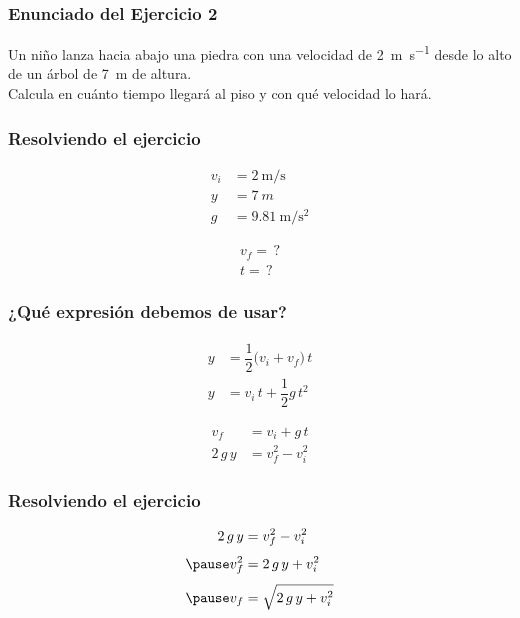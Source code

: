 \documentclass[14pt]{beamer}
\begin{document}
\begin{frame}
\frametitle{Enunciado del Ejercicio 2}
Un niño lanza hacia abajo una piedra con una velocidad de \SI{2}{\meter\per\second} desde lo alto de un árbol de \SI{7}{\meter} de altura. 
\\
\bigskip
\pause
Calcula en cuánto tiempo llegará al piso y con qué velocidad lo hará.
\end{frame}
\begin{frame}
\frametitle{Resolviendo el ejercicio}
\vspace*{-0.3cm}
\pause
\begin{minipage}[t]{0.4\linewidth}
\begin{align*}
v_{i} &= \SI{2}{\meter\per\second} \\[0.5em]
y &= \SI{7}{m} \\[0.5em]
g &= \SI{9.81}{\meter\per\square\second}
\end{align*}
\end{minipage}
\hspace{0.2cm}
\pause
\begin{minipage}[t]{0.4\linewidth}
\begin{align*}
v_{f} = \, ? \\[0.5em]
t = \, ?
\end{align*}
\end{minipage}
\end{frame}
\begin{frame}
\frametitle{¿Qué expresión debemos de usar?}
\vspace*{-1cm}
\begin{minipage}[t]{0.4\linewidth}
\begin{align*}
y &= \dfrac{1}{2} \big( v_{i} + v_{f} \big) \, t  \\[0.5em]
y &= v_{i} \, t + \dfrac{1}{2} g \, t^{2}
\end{align*}
\end{minipage}
\begin{minipage}[t]{0.4\linewidth}
\begin{align*}
v_{f} &= v_{i} + g \, t \\[0.5em]
2 \, g \, y &= v_{f}^{2} - v_{i}^{2} 
\end{align*}
\end{minipage}
\end{frame}
\begin{frame}
\frametitle{Resolviendo el ejercicio}
\pause
\begin{eqnarray*}
\begin{aligned}
2 \, g \, y &= v_{f}^{2} - v_{i}^{2} \\[0.35em] \pause
v_{f}^{2} &= 2 \, g \, y + v_{i}^{2} \\[0.35em] \pause
v_{f} &= \sqrt{2 \, g \, y + v_{i}^{2}} 
\end{aligned}
\end{eqnarray*}
\end{frame}
\end{document}
